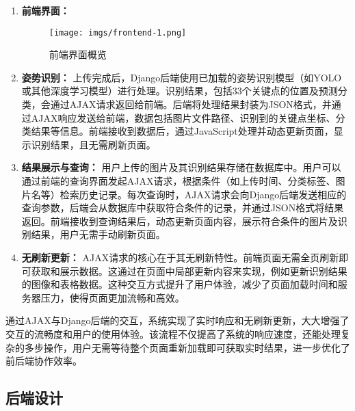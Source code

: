 \begin{enumerate}
    \item \textbf{前端界面：}

    \begin{figure}[H]
        \centering
        \texttt{[image: imgs/frontend-1.png]}
        \caption{前端界面概览}
        \label{fig:file-tree}
    \end{figure}

    \item \textbf{姿势识别：}
    上传完成后，Django后端使用已加载的姿势识别模型（如YOLO或其他深度学习模型）进行处理。识别结果，包括33个关键点的位置及预测分类，会通过AJAX请求返回给前端。后端将处理结果封装为JSON格式，并通过AJAX响应发送给前端，数据包括图片文件路径、识别到的关键点坐标、分类结果等信息。前端接收到数据后，通过JavaScript处理并动态更新页面，显示识别结果，且无需刷新页面。

    \item \textbf{结果展示与查询：}
    用户上传的图片及其识别结果存储在数据库中。用户可以通过前端的查询界面发起AJAX请求，根据条件（如上传时间、分类标签、图片名等）检索历史记录。每次查询时，AJAX请求会向Django后端发送相应的查询参数，后端会从数据库中获取符合条件的记录，并通过JSON格式将结果返回。前端接收到查询结果后，动态更新页面内容，展示符合条件的图片及识别结果，用户无需手动刷新页面。

    \item \textbf{无刷新更新：}
    AJAX请求的核心在于其无刷新特性。前端页面无需全页刷新即可获取和展示数据。这通过在页面中局部更新内容来实现，例如更新识别结果的图像和表格数据。这种交互方式提升了用户体验，减少了页面加载时间和服务器压力，使得页面更加流畅和高效。

\end{enumerate}

通过AJAX与Django后端的交互，系统实现了实时响应和无刷新更新，大大增强了交互的流畅度和用户的使用体验。该流程不仅提高了系统的响应速度，还能处理复杂的多步操作，用户无需等待整个页面重新加载即可获取实时结果，进一步优化了前后端协作效率。


\subsection{后端设计}

